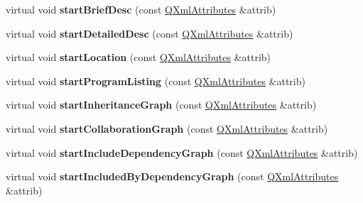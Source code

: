 \begin{DoxyCompactItemize}
\item 
\hypertarget{class_compound_handler_a104aa450d7ed98aaaf929bf81eb3252e}{virtual void {\bfseries start\-Brief\-Desc} (const \hyperlink{class_q_xml_attributes}{Q\-Xml\-Attributes} \&attrib)}\label{class_compound_handler_a104aa450d7ed98aaaf929bf81eb3252e}

\item 
\hypertarget{class_compound_handler_a94f6cc704f336be42dd887b95f86a106}{virtual void {\bfseries start\-Detailed\-Desc} (const \hyperlink{class_q_xml_attributes}{Q\-Xml\-Attributes} \&attrib)}\label{class_compound_handler_a94f6cc704f336be42dd887b95f86a106}

\item 
\hypertarget{class_compound_handler_a588050483d3f93dc2854f3abdbdbfa4f}{virtual void {\bfseries start\-Location} (const \hyperlink{class_q_xml_attributes}{Q\-Xml\-Attributes} \&attrib)}\label{class_compound_handler_a588050483d3f93dc2854f3abdbdbfa4f}

\item 
\hypertarget{class_compound_handler_ae03e5c8c64478d96c0e32aa7738e16b6}{virtual void {\bfseries start\-Program\-Listing} (const \hyperlink{class_q_xml_attributes}{Q\-Xml\-Attributes} \&attrib)}\label{class_compound_handler_ae03e5c8c64478d96c0e32aa7738e16b6}

\item 
\hypertarget{class_compound_handler_ac937eeee5effa83a9bb9eb68665be9a5}{virtual void {\bfseries start\-Inheritance\-Graph} (const \hyperlink{class_q_xml_attributes}{Q\-Xml\-Attributes} \&attrib)}\label{class_compound_handler_ac937eeee5effa83a9bb9eb68665be9a5}

\item 
\hypertarget{class_compound_handler_aed5ba494e128f87ff7b51cde2cdbc4de}{virtual void {\bfseries start\-Collaboration\-Graph} (const \hyperlink{class_q_xml_attributes}{Q\-Xml\-Attributes} \&attrib)}\label{class_compound_handler_aed5ba494e128f87ff7b51cde2cdbc4de}

\item 
\hypertarget{class_compound_handler_ac2a6c80ad07801e94431c37bf8597124}{virtual void {\bfseries start\-Include\-Dependency\-Graph} (const \hyperlink{class_q_xml_attributes}{Q\-Xml\-Attributes} \&attrib)}\label{class_compound_handler_ac2a6c80ad07801e94431c37bf8597124}

\item 
\hypertarget{class_compound_handler_a44afae59dd991d586b9d2391d24be6d1}{virtual void {\bfseries start\-Included\-By\-Dependency\-Graph} (const \hyperlink{class_q_xml_attributes}{Q\-Xml\-Attributes} \&attrib)}\label{class_compound_handler_a44afae59dd991d586b9d2391d24be6d1}


\end{DoxyCompactItemize}
